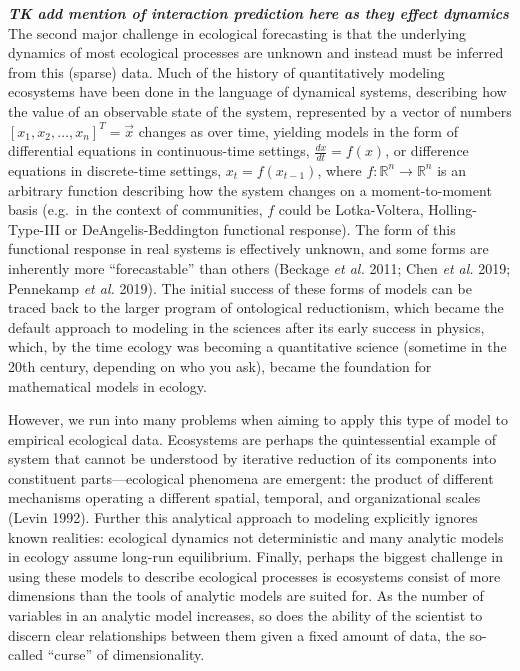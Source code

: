 \documentclass[10pt,oneside]{article}
\begin{document}
\textbf{\emph{TK add mention of interaction prediction here as they
effect dynamics}} The second major challenge in ecological forecasting
is that the underlying dynamics of most ecological processes are unknown
and instead must be inferred from this (sparse) data. Much of the
history of quantitatively modeling ecosystems have been done in the
language of dynamical systems, describing how the value of an observable
state of the system, represented by a vector of numbers
\([x_1, x_2, \dots, x_n]^T = \vec{x}\) changes as over time, yielding
models in the form of differential equations in continuous-time
settings, \(\frac{dx}{dt} = f(x)\), or difference equations in
discrete-time settings, \(x_t = f(x_{t-1})\), where
\(f:\mathbb{R}^n \to \mathbb{R}^n\) is an arbitrary function describing
how the system changes on a moment-to-moment basis (e.g.~in the context
of communities, \(f\) could be Lotka-Voltera, Holling-Type-III or
DeAngelis-Beddington functional response). The form of this functional
response in real systems is effectively unknown, and some forms are
inherently more ``forecastable'' than others (Beckage \emph{et al.}
2011; Chen \emph{et al.} 2019; Pennekamp \emph{et al.} 2019). The
initial success of these forms of models can be traced back to the
larger program of ontological reductionism, which became the default
approach to modeling in the sciences after its early success in physics,
which, by the time ecology was becoming a quantitative science (sometime
in the 20th century, depending on who you ask), became the foundation
for mathematical models in ecology.

However, we run into many problems when aiming to apply this type of
model to empirical ecological data. Ecosystems are perhaps the
quintessential example of system that cannot be understood by iterative
reduction of its components into constituent parts---ecological
phenomena are emergent: the product of different mechanisms operating a
different spatial, temporal, and organizational scales (Levin 1992).
Further this analytical approach to modeling explicitly ignores known
realities: ecological dynamics not deterministic and many analytic
models in ecology assume long-run equilibrium. Finally, perhaps the
biggest challenge in using these models to describe ecological processes
is ecosystems consist of more dimensions than the tools of analytic
models are suited for. As the number of variables in an analytic model
increases, so does the ability of the scientist to discern clear
relationships between them given a fixed amount of data, the so-called
``curse'' of dimensionality.
\end{document}
